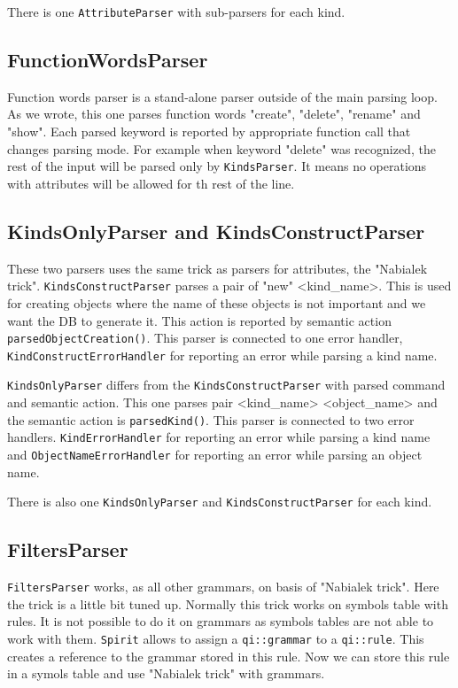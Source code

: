 \documentclass[deska]{subfiles}
\begin{document}
There is one {\tt AttributeParser} with sub-parsers for each kind.

\subsection{FunctionWordsParser}

Function words parser is a stand-alone parser outside of the main parsing loop. As we wrote, this one parses function words
"create", "delete", "rename" and "show". Each parsed keyword is reported by appropriate function call that changes parsing mode.
For example when keyword "delete" was recognized, the rest of the input will be parsed only by {\tt KindsParser}. It means
no operations with attributes will be allowed for th rest of the line.

\subsection{KindsOnlyParser and KindsConstructParser}

These two parsers uses the same trick as parsers for attributes, the "Nabialek trick". {\tt KindsConstructParser} parses
a pair of "new" <kind\_name>. This is used for creating objects where the name of these objects is not important and we
want the DB to generate it. This action is reported by semantic action {\tt parsedObjectCreation()}. This parser is connected
to one error handler, {\tt KindConstructErrorHandler} for reporting an error while parsing a kind name.

{\tt KindsOnlyParser} differs from the {\tt KindsConstructParser} with parsed command and semantic action. This one parses
pair <kind\_name> <object\_name> and the semantic action is {\tt parsedKind()}. This parser is connected to two error handlers.
{\tt KindErrorHandler} for reporting an error while parsing a kind name and {\tt ObjectNameErrorHandler} for reporting an
error while parsing an object name.

There is also one {\tt KindsOnlyParser} and {\tt KindsConstructParser} for each kind. 

\subsection{FiltersParser}

{\tt FiltersParser} works, as all other grammars, on basis of "Nabialek trick". Here the trick is a little bit tuned up.
Normally this trick works on symbols table with rules. It is not possible to do it on grammars as symbols tables are not
able to work with them. {\tt Spirit} allows to assign a {\tt qi::grammar} to a {\tt qi::rule}. This creates a reference
to the grammar stored in this rule. Now we can store this rule in a symols table and use "Nabialek trick" with grammars.
\end{document}
